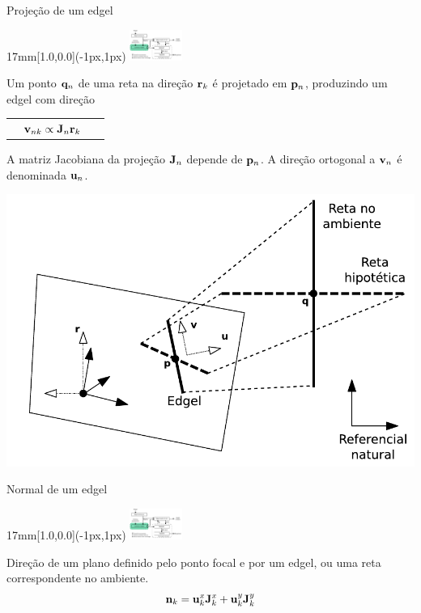 \begin{frame}{Projeção de um edgel}
  \begin{overprint}
  \begin{textblock*}{17mm}[1.0,0.0](\paperwidth-1px,1px)
    \includegraphics[width=17mm]{blocos_s2.png}
  \end{textblock*}
  Um ponto ${\mathbf{q}}_n$ de uma reta na
  direção ${\mathbf{r}}_k$ é projetado em ${\mathbf{p}}_n$, produzindo um edgel com direção
  \begin{tabularx}{\linewidth}{XCR}
    & ${\mathbf{v}}_{nk}\propto{\mathbf{J}}_n{\mathbf{r}}_k$ & ~
  \end{tabularx}
  
  A matriz Jacobiana da projeção ${\mathbf{J}}_n$ depende de ${\mathbf{p}}_n$. A direção
  ortogonal a ${\mathbf{v}}_n$ é denominada ${\mathbf{u}}_n$.

  \centerline{\includegraphics[height=8\baselineskip]{variaveis.pdf}}

\end{overprint}
\end{frame}


\begin{frame}{Normal de um edgel}
  \begin{textblock*}{17mm}[1.0,0.0](\paperwidth-1px,1px)
    \includegraphics[width=17mm]{blocos_s2.png}
  \end{textblock*}

  Direção de um plano definido pelo ponto focal e por um edgel, ou uma reta
  correspondente no ambiente.
  \[
  {\mathbf{n}}_k = {\mathbf{u}}_k^x {\mathbf{J}}_k^x +  {\mathbf{u}}_k^y {\mathbf{J}}_k^y
  \]


\end{frame}














